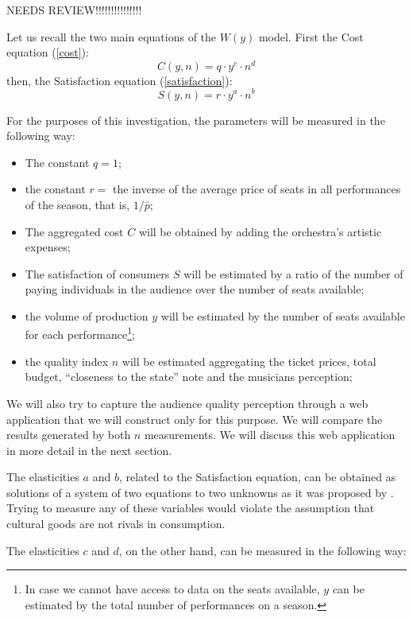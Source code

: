 \documentclass[a4paper, 12pt, openright, oneside, german, french, brazil, english]{abntex2}
\begin{document}
        NEEDS REVIEW!!!!!!!!!!!!!!!
        
        Let us recall the two main equations of the $W(y)$ model. First the Cost equation (\ref{cost}):
	$$C(y, n) = q \cdot y^c \cdot n^d$$
        then, the Satisfaction equation (\ref{satisfaction}):
        $$S(y, n) = r \cdot y^a \cdot n^b$$

        For the purposes of this investigation, the parameters will be measured in the following way:

        \begin{itemize}
        \item The constant $q = 1$;
        \item the constant $r =$ the inverse of the average price of seats in all performances of the season, that is, $1/\bar{p}$;
        \item The aggregated cost $C$ will be obtained by adding the orchestra's artistic expenses;
        \item The satisfaction of consumers $S$ will be estimated by a ratio of the number of paying individuals in the audience over the number of seats available;
        \item the volume of production $y$ will be estimated by the number of seats available for each performance\footnote{In case we cannot have access to data on the seats available, $y$ can be estimated by the total number of performances on a season.};
        \item the quality index $n$ will be estimated aggregating the ticket prices, total budget, ``closeness to the state'' note and the musicians perception;
        \end{itemize}

        We will also try to capture the audience quality perception through a web application that we will construct only for this purpose. We will compare the results generated by both $n$ measurements. We will discuss this web application in more detail in the next section.

        The elasticities $a$ and $b$, related to the Satisfaction equation, can be obtained as solutions of a system of two equations to two unknowns as it was proposed by . Trying to measure any of these variables would violate the assumption that cultural goods are not rivals in consumption.

        The elasticities $c$ and $d$, on the other hand, can be measured in the following way:
\end{document}
